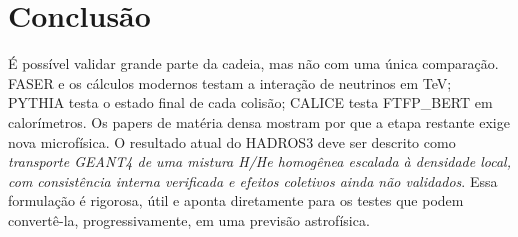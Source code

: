 \documentclass[11pt,a4paper]{article}
\begin{document}
\section{Conclusão}

É possível validar grande parte da cadeia, mas não com uma única comparação.
FASER e os cálculos modernos testam a interação de neutrinos em TeV; PYTHIA
testa o estado final de cada colisão; CALICE testa FTFP\_BERT em calorímetros.
Os papers de matéria densa mostram por que a etapa restante exige nova
microfísica. O resultado atual do HADROS3 deve ser descrito como
\emph{transporte GEANT4 de uma mistura H/He homogênea escalada à densidade
local, com consistência interna verificada e efeitos coletivos ainda não
validados}. Essa formulação é rigorosa, útil e aponta diretamente para os
testes que podem convertê-la, progressivamente, em uma previsão astrofísica.



\end{document}
